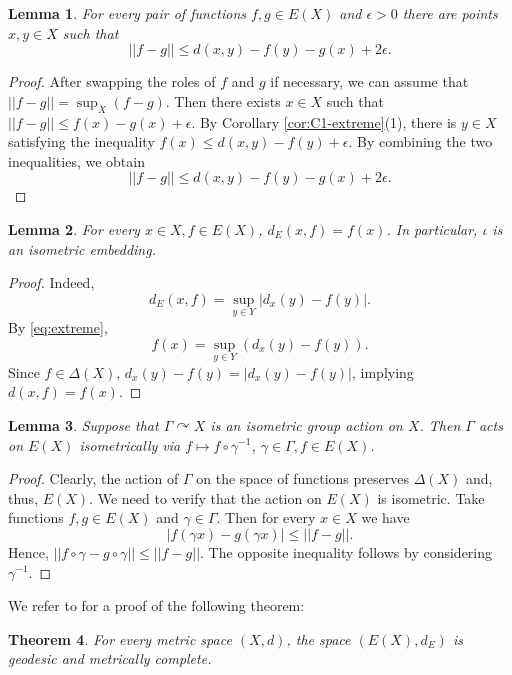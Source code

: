 \documentclass[12pt]{amsbook}%
\newtheorem{thm}{Theorem}[chapter]
\newtheorem{lem}[thm]{Lemma}
\theoremstyle{definition}
\theoremstyle{remark}
\numberwithin{section}{chapter}
\numberwithin{subsection}{section}
\numberwithin{figure}{chapter}
\DeclareMathOperator{\acts}{\curvearrowright}
\def\eps{\epsilon}
\def\Ga{\Gamma}
\def\ga{\gamma}
\begin{document}
\begin{lem}\label{lem:norm-estimate} 
For every pair of functions $f, g\in E(X)$ and $\eps>0$ there are points $x, y\in X$ such that 
$$
||f-g||\leqslant d(x,y) - f(y)- g(x) +2\eps. 
$$
\end{lem}
\begin{proof} %
After swapping the roles of $f$ and $g$ if necessary, we can assume that  $||f-g||=\sup_X (f-g)$. 
Then there exists $x\in X$ such that $||f-g||\leqslant f(x) - g(x) +\eps$. By Corollary \ref{cor:C1-extreme}(1), 
there is $y\in X$ satisfying the inequality $f(x)\leqslant d(x,y) - f(y) +\eps$. 
By combining the two inequalities, we obtain
$$
||f-g||\leqslant d(x,y) - f(y) - g(x) +2\eps. 
$$
\end{proof}


\begin{lem}
For every $x\in X, f\in E(X)$, $d_E(x,f)=f(x)$. In particular, $\iota$ is an isometric embedding. 
\end{lem}
\begin{proof} 
Indeed,
$$
d_E(x,f)= \sup_{y\in Y} |d_x(y) -f(y)|.
$$
By \eqref{eq:extreme},
$$
f(x)=\sup_{y\in Y} (d_x(y)-f(y)).
$$
Since $f\in \Delta(X)$, $d_x(y)-f(y)=|d_x(y)-f(y)|$, implying $d(x,f)=f(x)$. \end{proof}

\begin{lem}\label{lem:group actions on hulls}
Suppose that $\Ga\acts X$ is an isometric group action on $X$. Then $\Ga$ acts on $E(X)$ isometrically via $f\mapsto f\circ \ga^{-1}$, $\ga\in \Ga, f\in E(X)$.  
\end{lem}
\begin{proof} Clearly, the action of $\Ga$ on the space of functions preserves $\Delta(X)$ and, thus, $E(X)$. We need to verify that the action on $E(X)$ is isometric. 
Take functions $f, g\in E(X)$ and $\ga\in \Ga$. Then for every $x\in X$ we have
$$
|f(\ga x)-g(\ga x)|\leqslant ||f-g||.
$$ 
Hence, $||f\circ \ga - g\circ \ga||\leqslant ||f-g||$. The opposite inequality follows by considering $\ga^{-1}$. 
\end{proof}



We refer to \cite{Lang} for a proof of the following theorem: 

\begin{thm}\label{thm:geodesic and complete}
For every metric space $(X,d)$, the space $(E(X),d_E)$ is geodesic and metrically complete. 
\end{thm}
\end{document}
